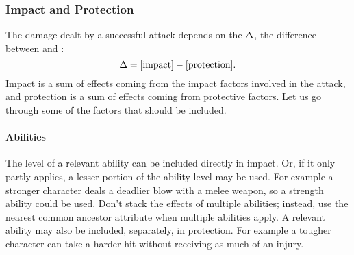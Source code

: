 \subsubsection{Impact and Protection}\label{sec:ndf}
The damage dealt by a successful attack depends on the  $\Delta$,
the difference between  and :
$$ \Delta = \text{[impact]} - \text{[protection]}. $$
Impact is a sum of effects coming from the impact factors involved in the attack,
and protection is a sum of effects coming from protective factors.
Let us go through some of the factors that should be included.

\paragraph{Abilities}
The level of a relevant ability can be included directly in impact.
Or, if it only partly applies, a lesser portion of the ability level may be used.
For example a stronger character deals a deadlier blow with a melee weapon, so a strength ability could be used.
Don't stack the effects of multiple abilities; instead, use the nearest common ancestor attribute when multiple abilities apply.
A relevant ability may also be included, separately, in protection.
For example a tougher character can take a harder hit without receiving as much of an injury.

